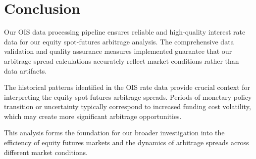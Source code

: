 \documentclass{article}
\begin{document}
\section{Conclusion}
Our OIS data processing pipeline ensures reliable and high-quality interest rate data for our equity spot-futures arbitrage analysis. The comprehensive data validation and quality assurance measures implemented guarantee that our arbitrage spread calculations accurately reflect market conditions rather than data artifacts.

The historical patterns identified in the OIS rate data provide crucial context for interpreting the equity spot-futures arbitrage spreads. Periods of monetary policy transition or uncertainty typically correspond to increased funding cost volatility, which may create more significant arbitrage opportunities.

This analysis forms the foundation for our broader investigation into the efficiency of equity futures markets and the dynamics of arbitrage spreads across different market conditions.
\end{document}
